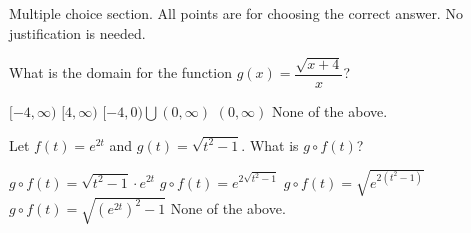 Multiple choice section. All points are for choosing the correct answer. No justification is needed.
\begin{questions} 



\question[3] What is the domain for the function $g(x)=\dfrac{\sqrt{x+4}}{x}$?
\begin{choices}
    \choice \chooseone $[-4,\infty)$
    \choice \chooseone $[4,\infty)$
    \choice \chooseone $[-4,0)\bigcup (0,\infty)$
    \choice \chooseone $(0,\infty)$
    \choice \chooseone None of the above.
\end{choices}


\question[3] Let $f(t)=e^{2t}$ and $g(t)=\sqrt{t^2-1}$. What is $g\circ f(t)$? 
    \begin{choices}
   \choice \chooseone $g\circ f(t)=\sqrt{t^2-1}\cdot e^{2t}$
   \choice \chooseone $g\circ f(t)= e^{2\sqrt{t^2-1}}$
   \choice \chooseone $g\circ f(t)=\sqrt{e^{2(t^2-1)}}$
   \choice \chooseone $g\circ f(t)=\sqrt{(e^{2t})^2-1}$
   \choice \chooseone None of the above.
\end{choices}



\question %
\end{questions}
